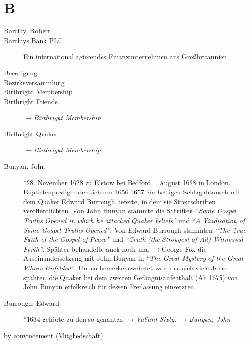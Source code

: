 \section*{B}

\articlesize

\begin{description}

 \item[Barclay, Robert]

 \item[Barclays Bank PLC] Ein international agierendes Finanzunternehmen aus Großbritannien.

 \item[Beerdigung]
 \item[Bezirksversammlung]
 \item[Birthright Membership]
 \item[Birthright Friends] $\to$\textit{Birthright Membership}
 \item[Birthright Quaker] $\to$\textit{Birthright Membership}

 \item[Bunyan, John] $\ast$28. November 1628 zu Elstow bei Bedford, . August 1688 in London. Baptistenprediger der sich um 1656-1657 ein heftigen Schlagabtausch mit dem Quaker Edward Burrough lieferte, in dem sie Streitschriften veröffentlichten. Von John Bunyan stammte die Schriften \textit{"`Some Gospel Truths Opened in which he attacked Quaker beliefs"'} und \textit{"`A Vindication of Some Gospel Truths Opened"'}. Von Edward Burrough stammten \textit{"`The True Faith of the Gospel of Peace"'} und \textit{"`Truth (the Strongest of All) Witnessed Forth"'}. Spähter behandelte auch noch mal $\to$George Fox die Auseinandersetzung mit John Bunyan in \textit{"`The Great Mystery of the Great Whore Unfolded"'}. Um so bemerkenswehrtet war, das sich viele Jahre spähter, die Quaker bei dem zweiten Gefängnisaufenthalt (Ab 1675) von John Bunyan erfolkreich für dessen Freilassung einsetzten.

 \item[Burrough, Edward] $\ast$1634  gehörte zu den so genanten $\to$\textit{Valiant Sixty}. $\to$\textit{Bunyan, John}
 \item[by convincement (Mitgliedschaft)]
 \end{description}

\normalsize

